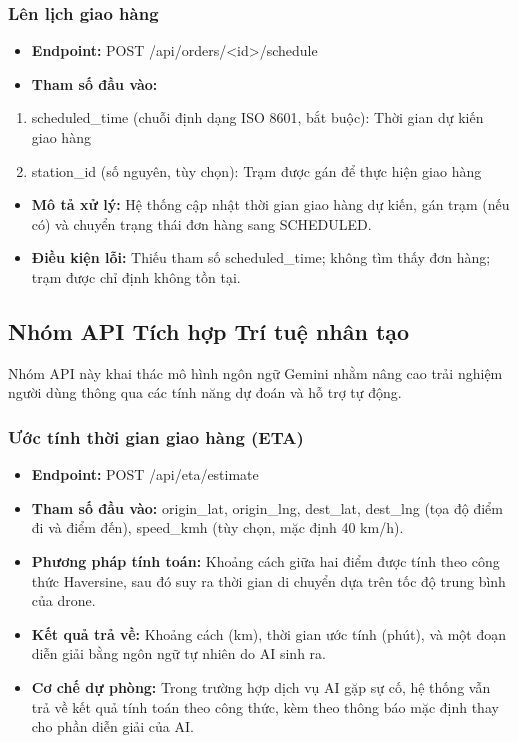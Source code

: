 \subsubsection{Lên lịch giao hàng}

\begin{itemize}
\item
  \textbf{Endpoint:} POST /api/orders/<id>/schedule
\item
  \textbf{Tham số đầu vào:}
\end{itemize}

\begin{enumerate}
\def\labelenumi{\arabic{enumi}.}
\item
  scheduled\_time (chuỗi định dạng ISO 8601, bắt buộc): Thời gian dự kiến giao hàng
\item
  station\_id (số nguyên, tùy chọn): Trạm được gán để thực hiện giao hàng
\end{enumerate}

\begin{itemize}
\item
  \textbf{Mô tả xử lý:} Hệ thống cập nhật thời gian giao hàng dự kiến, gán trạm (nếu có) và chuyển trạng thái đơn hàng sang SCHEDULED.
\item
  \textbf{Điều kiện lỗi:} Thiếu tham số scheduled\_time; không tìm thấy đơn hàng; trạm được chỉ định không tồn tại.
\end{itemize}

\subsection{Nhóm API Tích hợp Trí tuệ nhân tạo}

Nhóm API này khai thác mô hình ngôn ngữ Gemini nhằm nâng cao trải nghiệm người dùng thông qua các tính năng dự đoán và hỗ trợ tự động.

\subsubsection{Ước tính thời gian giao hàng (ETA)}

\begin{itemize}
\item
  \textbf{Endpoint:} POST /api/eta/estimate
\item
  \textbf{Tham số đầu vào:} origin\_lat, origin\_lng, dest\_lat, dest\_lng (tọa độ điểm đi và điểm đến), speed\_kmh (tùy chọn, mặc định 40 km/h).
\item
  \textbf{Phương pháp tính toán:} Khoảng cách giữa hai điểm được tính theo công thức Haversine, sau đó suy ra thời gian di chuyển dựa trên tốc độ trung bình của drone.
\item
  \textbf{Kết quả trả về:} Khoảng cách (km), thời gian ước tính (phút), và một đoạn diễn giải bằng ngôn ngữ tự nhiên do AI sinh ra.
\item
  \textbf{Cơ chế dự phòng:} Trong trường hợp dịch vụ AI gặp sự cố, hệ thống vẫn trả về kết quả tính toán theo công thức, kèm theo thông báo mặc định thay cho phần diễn giải của AI.
\end{itemize}

